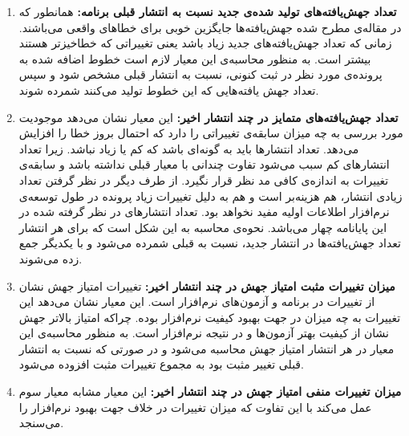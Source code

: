 \begin{enumerate}
	\item  
	\textbf{
		تعداد جهش‌یافته‌های تولید شده‌ی جدید نسبت به انتشار قبلی برنامه: }همانطور که در مقاله‌ی \cite{just2014mutants} مطرح شده جهش‌یافته‌ها جایگزین خوبی برای خطاهای واقعی می‌باشند. زمانی که تعداد جهش‌یافته‌های جدید زیاد باشد یعنی تغییراتی که خطا‌خیز‌تر هستند بیشتر است. به منظور محاسبه‌ی این معیار لازم است خطوط اضافه شده به پرونده‌ی مورد نظر در ثبت کنونی، نسبت به انتشار قبلی مشخص شود و سپس تعداد جهش یافته‌هایی که این خطوط تولید می‌کنند شمرده شوند. 
	\item 
	\textbf{
		تعداد جهش‌یافته‌های متمایز در چند انتشار اخیر:} این معیار نشان می‌دهد موجودیت مورد بررسی به چه میزان سابقه‌ی تغییراتی را دارد که احتمال بروز خطا را افزایش می‌دهد. تعداد انتشارها باید به گونه‌ای باشد که کم یا زیاد نباشد. زیرا تعداد انتشارهای کم سبب می‌شود تفاوت چندانی با معیار قبلی نداشته باشد و سابقه‌ی تغییرات به اندازه‌ی کافی مد نظر قرار نگیرد. از طرف دیگر در نظر گرفتن تعداد زیادی انتشار، هم هزینه‌بر است و هم به دلیل تغییرات زیاد  پرونده در طول توسعه‌ی نرم‌افزار اطلاعات اولیه مفید نخواهد بود.  تعداد انتشارهای  در نظر گرفته شده در این پایانامه چهار می‌باشد. نحوه‌ی محاسبه به این شکل است که برای هر انتشار تعداد جهش‌یافته‌ها در انتشار جدید، نسبت به قبلی  شمرده می‌شود و با یکدیگر جمع زده  می‌شوند. 
	
	\item 
	\textbf{
		میزان تغییرات مثبت امتیاز جهش  در چند انتشار اخیر:}
	تغییرات امتیاز جهش نشان از تغییرات در برنامه و آزمون‌های نرم‌افزار است. این معیار نشان می‌دهد این تغییرات به چه میزان در جهت بهبود کیفیت نرم‌افزار بوده. چراکه امتیاز بالاتر جهش نشان از کیفیت بهتر آزمون‌ها و در نتیجه نرم‌افزار است.  به منظور محاسبه‌ی این معیار در هر انتشار امتیاز جهش محاسبه می‌شود و در صورتی که نسبت به انتشار قبلی تغییر مثبت  بود به مجموع تغییرات  مثبت  افزوده می‌شود. 
	\item 
	\textbf{
		میزان تغییرات منفی امتیاز جهش در چند انتشار اخیر:}
	این معیار مشابه معیار سوم عمل می‌کند با این تفاوت که میزان تغییرات در خلاف جهت بهبود نرم‌افزار را می‌سنجد. 	
	
\end{enumerate}


